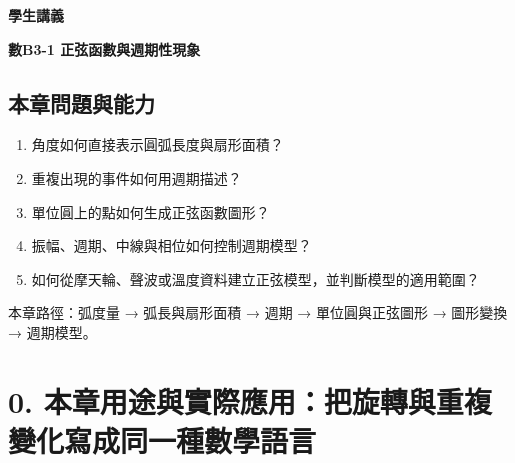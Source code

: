 \documentclass[11pt,a4paper]{article}
\providecommand{\tightlist}{%
  \setlength{\itemsep}{0pt}\setlength{\parskip}{0pt}}
\begin{document}
\begin{tcolorbox}[
  enhanced,colback=white,colframe=HandoutBlue,boxrule=1.1pt,arc=2mm,
  borderline west={3pt}{0pt}{HandoutBlue},left=5mm,right=4mm,top=4mm,bottom=4mm
]
{\sffamily\small\bfseries\color{HandoutBlue}學生講義}\par
{\sffamily\bfseries\LARGE\color{HandoutInk}數B3-1 正弦函數與週期性現象}\par
\vspace{0.35em}{\large 用弧度連結圓周運動與正弦圖形，以振幅、週期和平移描述重複變化}\par
{}\par
{}\par
\end{tcolorbox}


\begin{HandoutLearningMap}

\subsection{本章問題與能力}\label{ux672cux7ae0ux554fux984cux8207ux80fdux529b}

\begin{enumerate}
\def\labelenumi{\arabic{enumi}.}
\tightlist
\item
  角度如何直接表示圓弧長度與扇形面積？
\item
  重複出現的事件如何用週期描述？
\item
  單位圓上的點如何生成正弦函數圖形？
\item
  振幅、週期、中線與相位如何控制週期模型？
\item
  如何從摩天輪、聲波或溫度資料建立正弦模型，並判斷模型的適用範圍？
\end{enumerate}

本章路徑：弧度量 → 弧長與扇形面積 → 週期 → 單位圓與正弦圖形 → 圖形變換 → 週期模型。

\end{HandoutLearningMap}

\section{0. 本章用途與實際應用：把旋轉與重複變化寫成同一種數學語言}\label{ux672cux7ae0ux7528ux9014ux8207ux5be6ux969bux61c9ux7528ux628aux65cbux8f49ux8207ux91cdux8907ux8b8aux5316ux5bebux6210ux540cux4e00ux7a2eux6578ux5b78ux8a9eux8a00}
\end{document}
